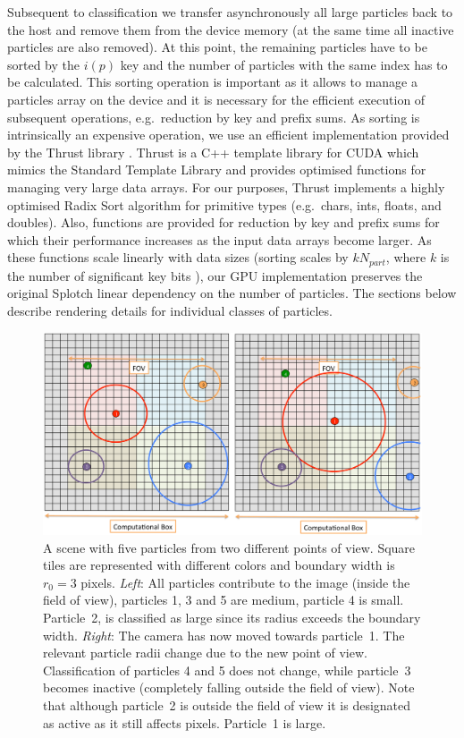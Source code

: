 \documentclass[smallextended]{svjour3}
\begin{document}
Subsequent to classification we transfer asynchronously all large particles back to the host and remove them from the device memory (at the same time all inactive particles are also removed). At this point, the remaining particles have to be sorted by the $i(p)$ key and the number of particles with the same index has to be calculated.
This sorting operation is important as it allows to manage a particles array on the device and it is  
necessary for the efficient execution of subsequent operations, e.g.\ reduction by key and prefix sums.
As sorting is intrinsically an expensive operation, we use an efficient implementation provided by the Thrust library \cite{thrusturl}. Thrust is a C++ template library for CUDA which mimics the Standard Template Library and provides optimised functions for managing very large data arrays. For our purposes, Thrust implements a highly optimised Radix Sort algorithm for primitive types (e.g.\ chars, ints, floats, and doubles). Also, functions are provided for reduction by key and prefix sums for which their performance increases as the input data arrays become larger. As these functions scale linearly with data sizes (sorting scales by $kN_{part}$, where $k$ is the number of significant key bits \cite{RadixSort}), our GPU implementation preserves the original Splotch linear dependency on the number of particles. The sections below describe rendering details for individual classes of particles.

\begin{figure}
\includegraphics[scale=0.14]{fov.eps}
\caption{A scene with five particles from two different points of view. Square tiles are
represented with different colors and boundary width is $r_0=3$ pixels. {\em Left}: All particles contribute to the image (inside the field of view), particles 1, 3 and 5
are medium, particle 4 is small. Particle~2, is classified as large since its radius exceeds the boundary width. {\em Right}: The camera has now moved towards particle~1. The relevant particle radii change due to the new point
of view. Classification of particles 4 and 5 does not change, while particle~3
becomes inactive (completely falling outside the field of view). Note that although particle~2 is outside the field of view it is designated as active as it still affects pixels.
Particle~1 is large.
}
\label{fig:fov}
\end{figure}
\end{document}
